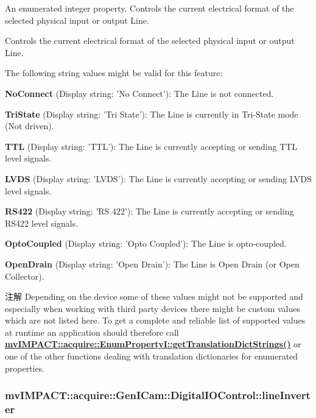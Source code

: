 An enumerated integer property. Controls the current electrical format of the selected physical input or output Line. 

Controls the current electrical format of the selected physical input or output Line.

The following string values might be valid for this feature\+:
\begin{DoxyItemize}
\item {\bfseries No\+Connect} (Display string\+: 'No Connect')\+: The Line is not connected.
\item {\bfseries Tri\+State} (Display string\+: 'Tri State')\+: The Line is currently in Tri-\/\+State mode (Not driven).
\item {\bfseries T\+T\+L} (Display string\+: 'T\+T\+L')\+: The Line is currently accepting or sending T\+T\+L level signals.
\item {\bfseries L\+V\+D\+S} (Display string\+: 'L\+V\+D\+S')\+: The Line is currently accepting or sending L\+V\+D\+S level signals.
\item {\bfseries R\+S422} (Display string\+: 'R\+S 422')\+: The Line is currently accepting or sending R\+S422 level signals.
\item {\bfseries Opto\+Coupled} (Display string\+: 'Opto Coupled')\+: The Line is opto-\/coupled.
\item {\bfseries Open\+Drain} (Display string\+: 'Open Drain')\+: The Line is Open Drain (or Open Collector).
\end{DoxyItemize}

\begin{DoxyNote}{注解}
Depending on the device some of these values might not be supported and especially when working with third party devices there might be custom values which are not listed here. To get a complete and reliable list of supported values at runtime an application should therefore call {\bfseries \hyperlink{classmv_i_m_p_a_c_t_1_1acquire_1_1_enum_property_i_a0ba6ccbf5ee69784d5d0b537924d26b6}{mv\+I\+M\+P\+A\+C\+T\+::acquire\+::\+Enum\+Property\+I\+::get\+Translation\+Dict\+Strings()}} or one of the other functions dealing with translation dictionaries for enumerated properties. 
\end{DoxyNote}
\hypertarget{classmv_i_m_p_a_c_t_1_1acquire_1_1_gen_i_cam_1_1_digital_i_o_control_a05c64d63aafc81c859db263133c91ba2}{
\subsubsection[{line\+Inverter}]{ mv\+I\+M\+P\+A\+C\+T\+::acquire\+::\+Gen\+I\+Cam\+::\+Digital\+I\+O\+Control\+::line\+Inverter}}\label{classmv_i_m_p_a_c_t_1_1acquire_1_1_gen_i_cam_1_1_digital_i_o_control_a05c64d63aafc81c859db263133c91ba2}


